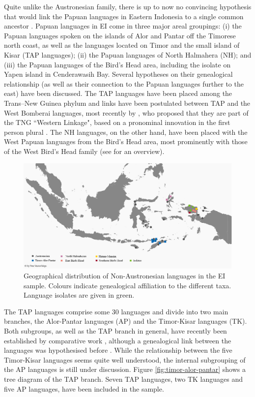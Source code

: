 Quite unlike the Austronesian family, there is up to now no convincing hypothesis that would link the Papuan languages in Eastern Indonesia to a single common ancestor \citep{reesink2005west, klamer2008east}. Papuan languages in EI come in three major areal groupings: (i) the Papuan languages spoken on the islands of Alor and Pantar off the Timorese north coast, as well as the languages located on Timor and the small island of Kisar (\textsc{TAP} languages); (ii) the Papuan languages of North Halmahera (NH); and (iii) the Papuan languages of the Bird's Head area, including the isolate  on Yapen island in Cenderawasih Bay. Several hypotheses on their genealogical relationship (as well as their connection to the Papuan languages further to the east) have been discussed. The TAP languages have been placed among the Trans--New Guinea phylum and links have been postulated between TAP and the West Bomberai languages, most recently by \citet{Ross2005}, who proposed that they are part of the TNG ``Western Linkage", based on a pronominal innovation in the first person plural \citep[9]{schapper2014intro}. The NH languages, on the other hand, have been placed with the West Papuan languages from the Bird's Head area, most prominently with those of the West Bird's Head family (see \citealt{reesink2005west} for an overview).

\begin{figure}
\includegraphics[width=\columnwidth]{figures/Map_overview_klein_Papuaff.eps}
\caption[Geographical distribution of Non-Austronesian languages in the sample]{Geographical distribution of Non-Austronesian languages in the EI sample. Colours indicate genealogical affiliation to the different taxa. Language isolates are given in green.}\label{map:Austro2}
\end{figure}

The TAP languages comprise some 30 languages and divide into two main branches, the Alor-Pantar languages (\textsc{AP}) and the Timor-Kisar languages (\textsc{TK}). Both subgroups, as well as the TAP branch in general, have recently been established by comparative work \citep{holton2012historical, klamer2014alor}, although a genealogical link between the languages was hypothesised before \citep[7]{schapper2014intro}. While the relationship between the five Timor-Kisar languages seems quite well understood, the internal subgrouping of the AP languages is still under discussion. Figure \ref{fig:timor-alor-pantar} shows a tree diagram of the TAP branch. Seven TAP languages, two TK languages and five AP languages, have been included in the sample.

